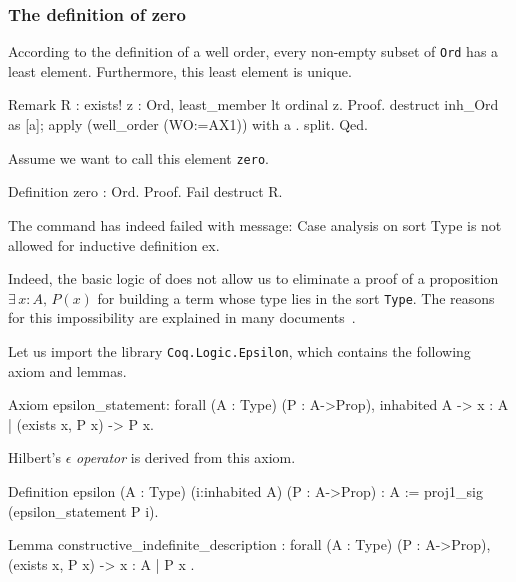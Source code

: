 \subsubsection{The definition of zero}

According to the  definition of a well order, every non-empty subset of \texttt{Ord} has a least element. Furthermore, this least element is unique.


\begin{Coqsrc}
Remark R : exists! z : Ord, least_member lt  ordinal z.
Proof.
  destruct inh_Ord as [a]; apply (well_order (WO:=AX1)) with a .
  split.
Qed.
\end{Coqsrc}

Assume we want to call this element  \texttt{zero}.



\begin{Coqsrc}
Definition zero : Ord.
Proof.
  Fail destruct R.
\end{Coqsrc}

\begin{Coqanswer}
The command has indeed failed with message:
Case analysis on sort Type is not allowed for inductive 
definition ex.
\end{Coqanswer}


Indeed, the basic logic of  \coq{} does not allow us to eliminate a proof of a proposition 
$\exists\,x:A,\,P(x)$ for building a term whose type lies in the sort \texttt{Type}. 
The reasons for this impossibility are explained in many documents~\cite{BC04, chlipalacpdt2011, Coq}.

Let us import the library \texttt{Coq.Logic.Epsilon}, which contains the following axiom and lemmas.


\begin{Coqsrc}
Axiom epsilon_statement:
  forall (A : Type) (P : A->Prop), inhabited A ->
    {x : A | (exists x, P x) -> P x}.
\end{Coqsrc}

Hilbert's $\epsilon$ \emph{operator} is derived from this  axiom.

\begin{Coqsrc}
Definition epsilon (A : Type) (i:inhabited A) (P : A->Prop) : A
  := proj1_sig (epsilon_statement P i).

Lemma constructive_indefinite_description :
  forall (A : Type) (P : A->Prop),
    (exists x, P x) -> { x : A | P x }.
\end{Coqsrc}




